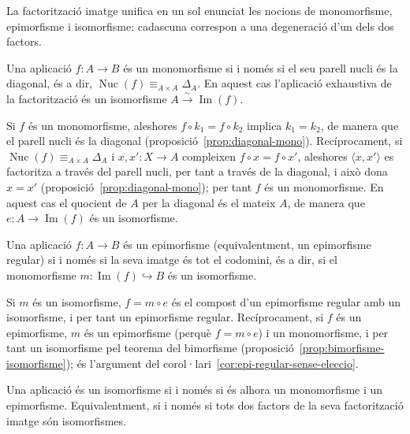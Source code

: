 La factorització imatge unifica en un sol enunciat les nocions de
monomorfisme, epimorfisme i isomorfisme: cadascuna correspon a una
degeneració d'un dels dos factors.

\begin{proposicio}\label{prop:mono-nucli-trivial}
Una aplicació \(f\colon A\to B\) és un monomorfisme si i només si el seu
parell nucli és la diagonal, és a dir,
\(\operatorname{Nuc}(f)\equiv_{A\times A}\Delta_A\). En aquest cas
l'aplicació exhaustiva de la factorització és un isomorfisme
\(A\xrightarrow{\sim}\operatorname{Im}(f)\).
\end{proposicio}

\begin{prova}
Si \(f\) és un monomorfisme, aleshores \(f\circ k_1=f\circ k_2\) implica
\(k_1=k_2\), de manera que el parell nucli és la diagonal
(proposició~\ref{prop:diagonal-mono}). Recíprocament, si
\(\operatorname{Nuc}(f)\equiv_{A\times A}\Delta_A\) i \(x,x'\colon X\to A\)
compleixen \(f\circ x=f\circ x'\), aleshores \(\langle x,x'\rangle\) es
factoritza a través del parell nucli, per tant a través de la diagonal, i
això dona \(x=x'\) (proposició~\ref{prop:diagonal-mono}); per tant \(f\) és
un monomorfisme. En aquest cas el quocient de \(A\) per la diagonal és el
mateix \(A\), de manera que \(e\colon A\to\operatorname{Im}(f)\) és un
isomorfisme.
\end{prova}

\begin{proposicio}\label{prop:epi-imatge-total}
Una aplicació \(f\colon A\to B\) és un epimorfisme (equivalentment, un
epimorfisme regular) si i només si la seva imatge és tot el codomini, és
a dir, si el monomorfisme \(m\colon\operatorname{Im}(f)\hookrightarrow B\)
és un isomorfisme.
\end{proposicio}

\begin{prova}
Si \(m\) és un isomorfisme, \(f=m\circ e\) és el compost d'un epimorfisme
regular amb un isomorfisme, i per tant un epimorfisme regular.
Recíprocament, si \(f\) és un epimorfisme, \(m\) és un epimorfisme (perquè
\(f=m\circ e\)) i un monomorfisme, i per tant un isomorfisme pel teorema
del bimorfisme (proposició~\ref{prop:bimorfisme-isomorfisme}); és
l'argument del corol·lari~\ref{cor:epi-regular-sense-eleccio}.
\end{prova}

\begin{corollari}\label{cor:bimorfisme-iso}
Una aplicació és un isomorfisme si i només si és alhora un monomorfisme i
un epimorfisme. Equivalentment, si i només si tots dos factors de
la seva factorització imatge són isomorfismes.
\end{corollari}

